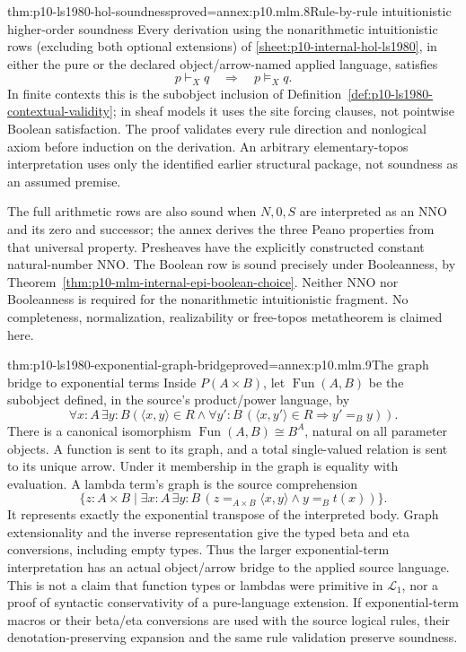 \begin{hbtheorem}{thm:p10-ls1980-hol-soundness}{proved=annex:p10.mlm.8}{Rule-by-rule intuitionistic higher-order soundness}
Every derivation using the nonarithmetic intuitionistic rows (excluding both
optional extensions) of
\ref{sheet:p10-internal-hol-ls1980}, in either the pure or the declared
object/arrow-named applied language, satisfies
\[
                 p\vdash_Xq\quad\Longrightarrow\quad p\models_Xq.
\]
In finite contexts this is the subobject inclusion of
Definition~\ref{def:p10-ls1980-contextual-validity}; in sheaf models it uses
the site forcing clauses, not pointwise Boolean satisfaction. The proof
validates every rule direction and nonlogical axiom before induction on the
derivation. An arbitrary elementary-topos interpretation uses only the
identified earlier structural package, not soundness as an assumed premise.

The full arithmetic rows are also sound when \(N,0,S\) are interpreted as an
NNO and its zero and successor; the annex derives the three Peano properties
from that universal property. Presheaves have the explicitly constructed
constant natural-number NNO. The Boolean row is sound precisely under
Booleanness, by Theorem~\ref{thm:p10-mlm-internal-epi-boolean-choice}.
Neither NNO nor Booleanness is required for the nonarithmetic intuitionistic
fragment. No completeness, normalization, realizability or free-topos
metatheorem is claimed here.
\end{hbtheorem}

\begin{hbtheorem}{thm:p10-ls1980-exponential-graph-bridge}{proved=annex:p10.mlm.9}{The graph bridge to exponential terms}
Inside \(P(A\times B)\), let \(\operatorname{Fun}(A,B)\) be the subobject
defined, in the source's product/power language, by
\[
 \forall x:A\,\exists y:B\left(\langle x,y\rangle\in R\wedge
       \forall y':B\,(\langle x,y'\rangle\in R\Rightarrow y'=_{B}y)\right).
\]
There is a canonical isomorphism \(\operatorname{Fun}(A,B)\cong B^A\),
natural on all parameter objects. A function is sent to its graph, and a
total single-valued relation is sent to its unique arrow. Under it membership
in the graph is equality with evaluation. A lambda term's graph is the
source comprehension
\[
 \{z:A\times B\mid\exists x:A\,\exists y:B\,
             (z=_{A\times B}\langle x,y\rangle\wedge y=_Bt(x))\}.
\]
It represents exactly the exponential transpose of the interpreted body.
Graph extensionality and the inverse representation give the typed beta and
eta conversions, including empty types. Thus the larger exponential-term
interpretation has an actual object/arrow bridge to the applied source
language. This is not a claim that function types or lambdas were primitive
in \(\mathcal L_1\), nor a proof of syntactic conservativity of a pure-language
extension. If exponential-term macros or their beta/eta conversions are used
with the source logical rules, their denotation-preserving expansion and the
same rule validation preserve soundness.
\end{hbtheorem}

